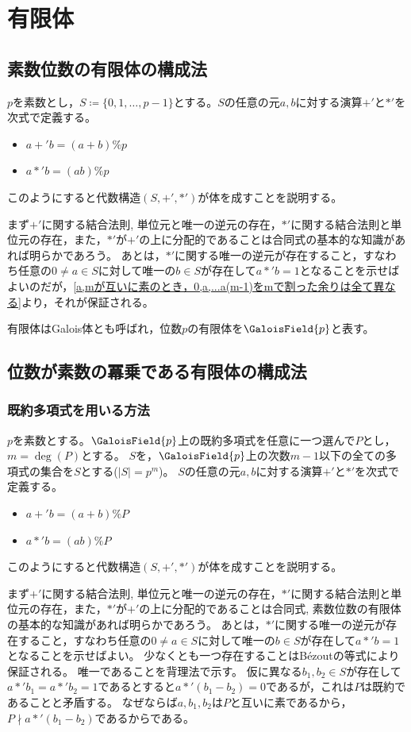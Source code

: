 \chapter{有限体}
    \section{素数位数の有限体の構成法}
        $p$を素数とし，$S\coloneq\{0,1,\dotsc,p-1\}$とする。$S$の任意の元$a,b$に対する演算$+'$と$*'$を次式で定義する。
        \begin{itemize}
            \item $a+'b = (a+b)\% p$
            \item $a*'b = (ab)\% p$
        \end{itemize}
        このようにすると代数構造$(S,+',*')$が体を成すことを説明する。
        \par
        まず$+'$に関する結合法則, 単位元と唯一の逆元の存在，$*'$に関する結合法則と単位元の存在，また，$*'$が$+'$の上に分配的であることは合同式の基本的な知識があれば明らかであろう。
        あとは，$*'$に関する唯一の逆元が存在すること，すなわち任意の$0 \neq a\in S$に対して唯一の$b\in S$が存在して$a*'b=1$となることを示せばよいのだが，\ref{a,mが互いに素のとき，0,a,...a(m-1)をmで割った余りは全て異なる}より，それが保証される。
        \par
        有限体はGalois体とも呼ばれ，位数$p$の有限体を$\GaloisField{p}$と表す。
    \section{位数が素数の冪乗である有限体の構成法}
        \subsection{既約多項式を用いる方法}
            $p$を素数とする。$\GaloisField{p}$上の既約多項式を任意に一つ選んで$P$とし，$m = \deg(P)$とする。
            $S$を，$\GaloisField{p}$上の次数$m-1$以下の全ての多項式の集合を$S$とする($|S|=p^m$)。
            $S$の任意の元$a,b$に対する演算$+'$と$*'$を次式で定義する。
            \begin{itemize}
                \item $a+'b = (a+b)\% P$
                \item $a*'b = (ab)\% P$
            \end{itemize}
            このようにすると代数構造$(S,+',*')$が体を成すことを説明する。
            \par
            まず$+'$に関する結合法則, 単位元と唯一の逆元の存在，$*'$に関する結合法則と単位元の存在，また，$*'$が$+'$の上に分配的であることは合同式, 素数位数の有限体の基本的な知識があれば明らかであろう。
            あとは，$*'$に関する唯一の逆元が存在すること，すなわち任意の$0 \neq a\in S$に対して唯一の$b\in S$が存在して$a*'b=1$となることを示せばよい。
            少なくとも一つ存在することはB\'ezoutの等式により保証される。
            唯一であることを背理法で示す。
            仮に異なる$b_1,b_2 \in S$が存在して$a*'b_1 = a*'b_2 = 1$であるとすると$a*'(b_1 - b_2) = 0$であるが，これは$P$は既約であることと矛盾する。
            なぜならば$a,b_1,b_2$は$P$と互いに素であるから，$P \nmid a*'(b_1 - b_2)$であるからである。
